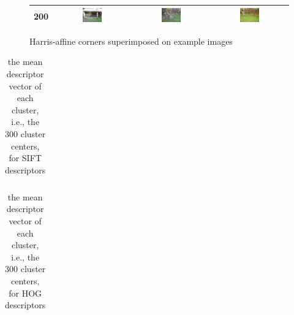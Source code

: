 \documentclass[a4paper,10pt]{article}
\begin{document}
\begin{figure}[h!]
\begin{center}
\begin{tabular}{ | c | c | c | c | }
		200 & \includegraphics[width=0.27\textwidth]{bike_001_200.png} & \includegraphics[width=0.27\textwidth]{bike_002_200.png} & \includegraphics[width=0.27\textwidth]{bike_003_200.png} \\ \hline

		\end{tabular}
	\end{center}
\caption{Harris-affine corners superimposed on example images}
\end{figure}

\begin{table}[h!]
	\begin{center}
		\begin{tabular}{ | c | c | c | c | }
		
		\end{tabular}
	\end{center}
\caption{the mean descriptor vector of each cluster, i.e., the 300 cluster centers, for SIFT descriptors}
\end{table}

\begin{table}[h!]
	\begin{center}
		\begin{tabular}{ | c | c | c | c | }
		
		\end{tabular}
	\end{center}
\caption{the mean descriptor vector of each cluster, i.e., the 300 cluster centers, for HOG descriptors}
\end{table}
\end{document}
